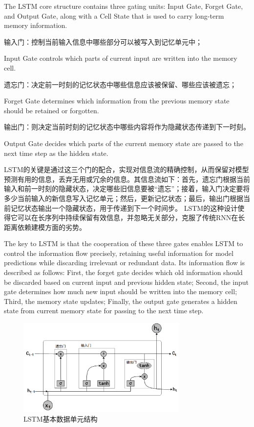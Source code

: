 The LSTM core structure contains three gating units: Input Gate, Forget Gate, and Output Gate, along with a Cell State that is used to carry long-term memory information.

输入门：控制当前输入信息中哪些部分可以被写入到记忆单元中；

Input Gate controls which parts of current input are written into the memory cell.

遗忘门：决定前一时刻的记忆状态中哪些信息应该被保留、哪些应该被遗忘；

Forget Gate determines which information from the previous memory state should be retained or forgotten.

输出门：则决定当前时刻的记忆状态中哪些内容将作为隐藏状态传递到下一时刻。

Output Gate decides which parts of the current memory state are passed to the next time step as the hidden state.

LSTM的关键是通过这三个门的配合，实现对信息流的精确控制，从而保留对模型预测有用的信息，丢弃无用或冗余的信息。其信息流如下：首先，遗忘门根据当前输入和前一时刻的隐藏状态，决定哪些旧信息要被“遗忘”；接着，输入门决定要将多少当前输入的新信息写入记忆单元；然后，更新记忆状态；最后，输出门根据当前记忆状态输出一个隐藏状态，用于传递到下一个时间步。
LSTM的这种设计使得它可以在长序列中持续保留有效信息，并忽略无关部分，克服了传统RNN在长距离依赖建模方面的劣势。

The key to LSTM is that the cooperation of these three gates enables LSTM to control the information flow precisely, retaining useful information for model predictions while discarding irrelevant or redundant data. Its information flow is described as follows: First, the forget gate decides which old information should be discarded based on current input and previous hidden state; Second, the input gate determines how much new input should be written into the memory cell; Third, the memory state updates; Finally, the output gate generates a hidden state from current memory state for passing to the next time step.

\begin{figure}[hbt]
	\centering
	\includegraphics[width=0.75\textwidth]{figures/2.5}
	\caption{LSTM基本数据单元结构}\label{fig:2.5}
\end{figure}

